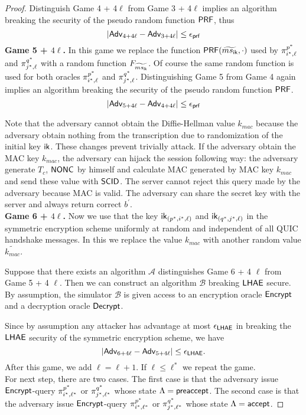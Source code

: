 \begin{proof}
 Distinguish Game 4 + 4$\ell$ from Game 3 + 4$\ell$ implies an algorithm breaking the security of the pseudo random function $\mathsf{PRF}$, thus
 \begin{equation}
  |\mathsf{Adv}_{4 + 4\ell} - \mathsf{Adv}_{3 + 4\ell}| \leq \epsilon_{\mathsf{prf}}
 \end{equation}%
%
%
 \textbf{Game 5 + $4\ell$.} In this game we replace the function $\mathsf{PRF}(\widetilde{ms_{\mathsf{ik}}}, \cdot)$ used by $\pi^{p^{\ast}}_{i^{\ast},\ell}$ and $\pi^{q^{\ast}}_{j^{\ast},\ell}$ with a random function $F_{\widetilde{ms_{\mathsf{ik}}}}$. Of course the same random function is used for both oracles $\pi^{p^{\ast}}_{i^{\ast},\ell}$ and $\pi^{q^{\ast}}_{j^{\ast},\ell}$. Distinguishing Game 5 from Game 4 again implies an algorithm breaking the security of the pseudo random function $\mathsf{PRF}$.
 \begin{equation}
  |\mathsf{Adv}_{5 + 4\ell} - \mathsf{Adv}_{4 + 4\ell}| \leq \epsilon_{\mathsf{prf}}
 \end{equation}%

 Note that the adversary cannot obtain the Diffie-Hellman value $k_{mac}$ because the adversary obtain nothing from the transcription due to randomization of the initial key $\mathsf{ik}$. These changes prevent trivially attack. If the adversary obtain the MAC key $k_{mac}$, the adversary can hijack the session following way: the adversary generate $T_c$, $\mathsf{NONC}$ by himself and calculate MAC generated by MAC key $k_{mac}$ and send these value with $\mathsf{SCID}$. The server cannot reject this query made by the adversary because MAC is valid. The adversary can share the secret key with the server and always return correct $b^{\prime}$.
\vspace{10pt}\\%
%
%
 \textbf{Game 6 + $4\ell$.} Now we use that the key $\mathsf{ik}_{(p^{\ast}, i^{\ast}, \ell)}$ and $\mathsf{ik}_{(q^{\ast}, j^{\ast}, \ell)}$ in the symmetric encryption scheme uniformly at random and independent of all QUIC handshake messages. In this we replace the value $k_{mac}$ with another random value $\widetilde{k_{mac}}$.

 Suppose that there exists an algorithm $\mathcal{A}$ distinguishes Game 6 + 4 $\ell$ from Game 5 + 4 $\ell$. Then we can construct an algorithm $\mathcal{B}$ breaking $\mathsf{LHAE}$ secure. By assumption, the simulator $\mathcal{B}$ is given access to an encryption oracle $\mathsf{Encrypt}$ and a decryption oracle $\mathsf{Decrypt}$.

 Since by assumption any attacker has advantage at most $\epsilon_{\mathsf{LHAE}}$ in breaking the $\mathsf{LHAE}$ security of the symmetric encryption scheme, we have
 \begin{equation}
  |\mathsf{Adv}_{6 + 4\ell} - \mathsf{Adv}_{5 + 4\ell}| \leq \epsilon_{\mathsf{LHAE}}.
 \end{equation}%
 After this game, we add $\ell = \ell + 1$. If $\ell \leq \ell^{\ast}$ we repeat the game.
\vspace{10pt}\\%
%
%
 For next step, there are two cases. The first case is that the adversary issue $\mathsf{Encrypt}$-query $\pi^{p^{\ast}}_{i^{\ast},\ell^{\ast}}$ or $\pi^{q^{\ast}}_{j^{\ast},\ell^{\ast}}$ whose state $\Lambda = \mathsf{preaccept}$. The second case is that the adversary issue $\mathsf{Encrypt}$-query $\pi^{p^{\ast}}_{i^{\ast},\ell^{\ast}}$ or $\pi^{q^{\ast}}_{j^{\ast},\ell^{\ast}}$ whose state $\Lambda = \mathsf{accept}$.


\end{proof}
